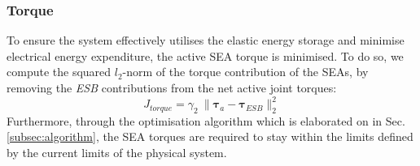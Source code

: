 \documentclass[letterpaper, 10 pt, conference]{ieeeconf}  %
\begin{document}

\subsubsection{Torque}
To ensure the system effectively utilises the elastic energy storage and minimise electrical energy expenditure, the active SEA torque is minimised. To do so, we compute the squared $l_2$-norm of the torque contribution of the SEAs, by removing the \textit{ESB} contributions from the net active joint torques:
\begin{equation}
	J_{torque}= \gamma_2 \: \| \boldsymbol{\tau}_a - \boldsymbol{\tau}_{ESB} \|_2^2
\end{equation}
Furthermore, through the optimisation algorithm which is elaborated on in Sec. \ref{subsec:algorithm}, the SEA torques are required to stay within the limits defined by the current limits of the physical system.
\end{document}
